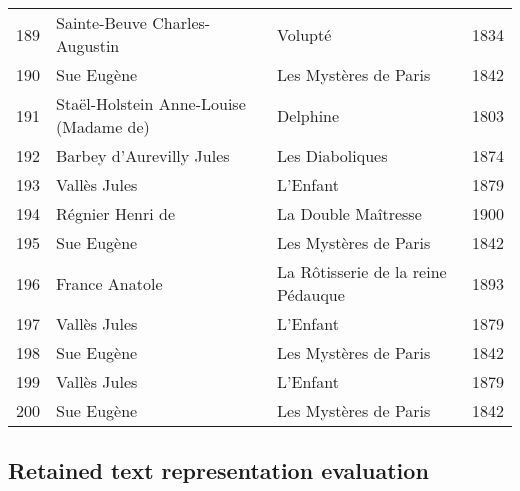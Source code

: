 \begin{center}
\begin{small}
\begin{longtable}{l l l l}
  189 & Sainte-Beuve Charles-Augustin & Volupté & 1834 \\
  190 & Sue Eugène & Les Mystères de Paris & 1842 \\
  191 & Staël-Holstein Anne-Louise (Madame de) & Delphine & 1803 \\
  192 & Barbey d'Aurevilly Jules & Les Diaboliques & 1874 \\
  193 & Vallès Jules & L'Enfant & 1879 \\
  194 & Régnier Henri de & La Double Maîtresse & 1900 \\
  195 & Sue Eugène & Les Mystères de Paris & 1842 \\
  196 & France Anatole & La Rôtisserie de la reine Pédauque & 1893 \\
  197 & Vallès Jules & L'Enfant & 1879 \\
  198 & Sue Eugène & Les Mystères de Paris & 1842 \\
  199 & Vallès Jules & L'Enfant & 1879 \\
  200 & Sue Eugène & Les Mystères de Paris & 1842 \\
  \bottomrule
\end{longtable}
\end{small}
\end{center}

\newpage
\subsection{Retained text representation evaluation}
\label{sec:annex_retained_text_representation}

